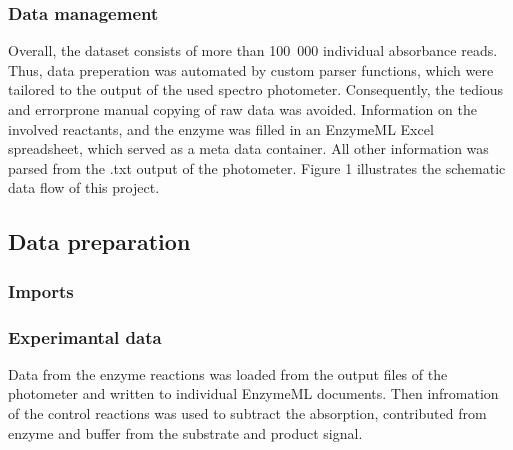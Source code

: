 \documentclass[letterpaper,10pt,english]{jupyterBook}
\begin{document}
\subsubsection{Data management}
\label{\detokenize{scenarios/SLAC_kinetic_characterization:data-management}}
\sphinxAtStartPar
Overall, the dataset consists of more than 100 000 individual absorbance reads. Thus, data preperation was automated by custom parser functions, which were tailored to the output of the used spectro photometer. Consequently, the tedious and error\sphinxhyphen{}prone manual copying of raw data was avoided. Information on the involved reactants, and the enzyme was filled in an EnzymeML Excel spreadsheet, which served as a meta data container. All other information was parsed from the .txt output of the photometer. Figure 1 illustrates the schematic data flow of this project.

\sphinxAtStartPar
{}


\subsection{Data preparation}
\label{\detokenize{scenarios/SLAC_kinetic_characterization:data-preparation}}

\subsubsection{Imports}
\label{\detokenize{scenarios/SLAC_kinetic_characterization:imports}}

\subsubsection{Experimantal data}
\label{\detokenize{scenarios/SLAC_kinetic_characterization:experimantal-data}}
\sphinxAtStartPar
Data from the enzyme reactions was loaded from the output files of the photometer and written to individual EnzymeML documents. Then infromation of the control reactions was used to subtract the absorption, contributed from enzyme and buffer from the substrate and product signal.
\end{document}
